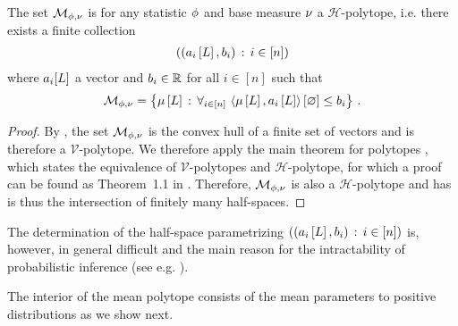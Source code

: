 \begin{theorem}
    \label{the:meanPolytopeHalfspaces}
    The set $\mathcal{M}_{\phi,\nu}$ is for any statistic $\phi$ and base measure $\nu$ a $\mathcal{H}$-polytope, i.e. there exists a finite collection
    \begin{align*}
        \left( (a_{i}\left[L\right],b_{i}) \, : \, i \in[n]\right)
    \end{align*}
    where $a_i[L]$ a vector and $b_i\in\mathbb{R}$ for all $i\in[n]$ such that
    \begin{align*}
        \mathcal{M}_{\phi,\nu}
        = \left\{\mu\left[L\right] \, : \, \forall_{i\in[n]} \, \left\langle \mu\left[L\right],a_{i}\left[L\right]\right\rangle \left[ \varnothing \right]\leq b_{i} \right\} \, .
    \end{align*}
\end{theorem}
\begin{proof}
    By , the set $\mathcal{M}_{\phi,\nu}$ is the convex hull of a finite set of vectors and is therefore a $\mathcal{V}$-polytope.
    We therefore apply the main theorem for polytopes \cite{motzkin_beitrage_1936}, which states the equivalence of $\mathcal{V}$-polytopes and $\mathcal{H}$-polytope, for which a proof can be found as Theorem~1.1 in \cite{ziegler_lectures_2013}.
    Therefore, $\mathcal{M}_{\phi,\nu}$ is also a $\mathcal{H}$-polytope and has is thus the intersection of finitely many half-spaces.
\end{proof}

The determination of the half-space parametrizing $\left( (a_{i}\left[L\right],b_{i}) \, : \, i \in[n]\right)$ is, however, in general difficult and the main reason for the intractability of probabilistic inference (see e.g. \cite{wainwright_graphical_2008}).



The interior of the mean polytope consists of the mean parameters to positive distributions as we show next.

